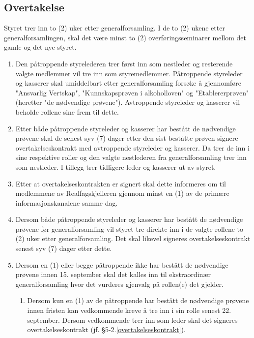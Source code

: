 \subsection{Overtakelse}\label{overtakelse}
Styret trer inn to (2) uker etter generalforsamling. I de to (2) ukene etter generalforsamlingen, skal det være minst to (2) overføringsseminarer mellom det gamle og det nye styret.
\begin{enumerate}
    \item Den påtroppende styrelederen trer først inn som nestleder og resterende valgte medlemmer vil tre inn som styremedlemmer. Påtroppende styreleder og kasserer skal umiddelbart etter generalforsamling forsøke å gjennomføre "Ansvarlig Vertskap", "Kunnskapsprøven i alkoholloven" og "Etablererprøven" (heretter "de nødvendige prøvene"). Avtroppende styreleder og kasserer vil beholde rollene sine frem til dette.
    \item Etter både påtroppende styreleder og kasserer har bestått de nødvendige prøvene skal de senest syv (7) dager etter den sist beståtte prøven signere overtakelseskontrakt med avtroppende styreleder og kasserer. Da trer de inn i sine respektive roller og den valgte nestlederen fra generalforsamling trer inn som nestleder. I tillegg trer tidligere leder og kasserer ut av styret. \label{overtakelseskontrakt}
    \item Etter at overtakelseskontrakten er signert skal dette informeres om til medlemmene av Realfagskjelleren gjennom minst en (1) av de primære informasjonskanalene samme dag.
    \item Dersom både påtroppende styreleder og kasserer har bestått de nødvendige prøvene før generalforsamling vil styret tre direkte inn i de valgte rollene to (2) uker etter generalforsamling. Det skal likevel signeres overtakelseskontrakt senest syv (7) dager etter dette.
    \item Dersom en (1) eller begge påtroppende ikke har bestått de nødvendige prøvene innen 15. september skal det kalles inn til ekstraordinær generalforsamling hvor det vurderes gjenvalg på rollen(e) det gjelder.
    \begin{enumerate}
        \item Dersom kun en (1) av de påtroppende har bestått de nødvendige prøvene innen fristen kan vedkommende kreve å tre inn i sin rolle senest 22. september. Dersom vedkommende trer inn som leder skal det signeres overtakelseskontrakt (jf. §5-2.\ref{overtakelseskontrakt}).
    \end{enumerate}

        
\end{enumerate}

